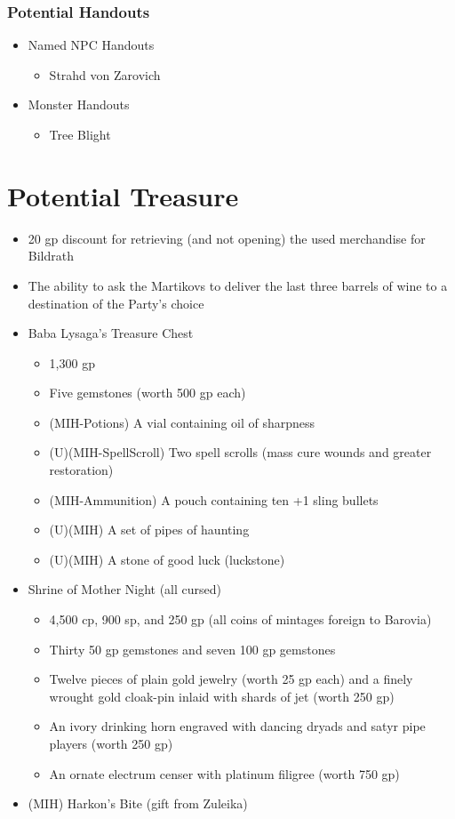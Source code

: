 \documentclass[a4paper,11pt]{article}
\begin{document}
\subsubsection{Potential Handouts}
\begin{itemize}
  \item Named NPC Handouts
  \begin{itemize}
    \item Strahd von Zarovich
  \end{itemize}
  \item Monster Handouts
  \begin{itemize}
    \item Tree Blight
  \end{itemize}
\end{itemize}

\section{Potential Treasure}
\label{sec:PotentialTreasure}
\begin{itemize}
  \item 20 gp discount for retrieving (and not opening) the used merchandise for Bildrath
  \item The ability to ask the Martikovs to deliver the last three barrels of wine to a destination of the 
  Party's choice
  \item Baba Lysaga's Treasure Chest
  \begin{itemize}
    \item 1,300 gp
    \item Five gemstones (worth 500 gp each)
    \item (MIH-Potions) A vial containing oil of sharpness
    \item (U)(MIH-SpellScroll) Two spell scrolls (mass cure wounds and greater restoration)
    \item (MIH-Ammunition) A pouch containing ten +1 sling bullets
    \item (U)(MIH) A set of pipes of haunting
    \item (U)(MIH) A stone of good luck (luckstone)
  \end{itemize}
  \item Shrine of Mother Night (all cursed)
  \begin{itemize}
    \item 4,500 cp, 900 sp, and 250 gp (all coins of mintages foreign to Barovia)
    \item Thirty 50 gp gemstones and seven 100 gp gemstones
    \item Twelve pieces of plain gold jewelry (worth 25 gp each) and a finely wrought gold cloak-pin inlaid with 
      shards of jet (worth 250 gp)
    \item An ivory drinking horn engraved with dancing dryads and satyr pipe players (worth 250 gp)
    \item An ornate electrum censer with platinum filigree (worth 750 gp)
  \end{itemize}
  \item (MIH) Harkon's Bite (gift from Zuleika)
\end{itemize}
\end{document}
